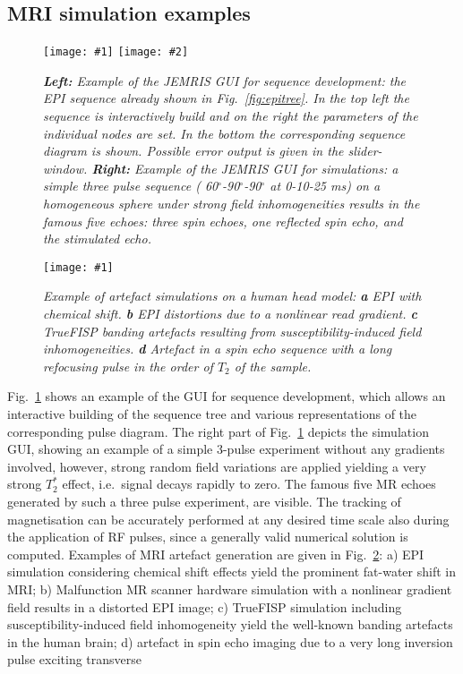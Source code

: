 \documentclass{nic-series}
\newcommand{\epsfigure}[5]{
 \begin{figure}[#4!]
   \begin{center}
    \texttt{[image: \#1]}
    \caption{{\sl #2}\label{#3}}
   \end{center}
 \end{figure}}
\newcommand{\epsfigures}[6]{
 \begin{figure}[#5!]
   \begin{center}
    \texttt{[image: \#1]}
    \hspace*{0.2cm}
    \texttt{[image: \#2]}
    \caption{{\sl #3}\label{#4}}
   \end{center}
 \end{figure}}
\begin{document}
\subsection{MRI simulation examples}
\epsfigures{fig/GUI_seq_ex1.eps}{fig/GUI_sim_ex1.eps}{{\bf Left:}  Example of the JEMRIS GUI for sequence development: the EPI sequence
			     already shown in Fig.~\ref{fig:epitree}. In the top left the sequence is interactively build and on the right
			     the parameters of the individual nodes are set. In the bottom the corresponding sequence
			     diagram is shown. Possible error output is given in the slider-window.
                             {\bf Right:} Example of the JEMRIS GUI for simulations: a simple three pulse sequence
			     ( 60$^\circ$-90$^\circ$-90$^\circ$ at 0-10-25 ms) on a homogeneous sphere under strong field inhomogeneities
			     results in the famous five echoes: three spin echoes, one reflected spin echo, and the stimulated
			     echo.}{fig:gui}{tp}{0.45}
\epsfigure{fig/simartex.eps}{Example of artefact simulations on a human head model: {\bf a} EPI with chemical shift.
                               {\bf b} EPI distortions due to a nonlinear read gradient. {\bf c} TrueFISP banding artefacts
				resulting from susceptibility-induced field inhomogeneities. {\bf d} Artefact in a spin echo
				sequence with a long refocusing pulse in the order of $T_2$ of the
				sample.}{fig:artifacts}{tp}{1.0}
Fig.~\ref{fig:gui} shows an example of the GUI for sequence development, which allows an interactive
building of the sequence tree and various representations of the corresponding pulse diagram. The right part of Fig.~\ref{fig:gui}
depicts the simulation GUI, showing an example of a simple 3-pulse experiment without any gradients involved, however, strong
random field variations are applied yielding a very strong $T_{2}^{*}$ effect, i.e.~signal decays rapidly to zero. The
famous five MR echoes generated by such a three pulse experiment, are visible. The tracking of magnetisation can be accurately
performed at any desired time scale also during the application of RF pulses, since a generally valid numerical solution is computed.
Examples of MRI artefact generation are given in Fig.~\ref{fig:artifacts}: a) EPI simulation considering chemical shift effects
yield the prominent fat-water shift in MRI; b) Malfunction MR scanner hardware simulation with a nonlinear gradient field results
in a distorted EPI image; c) TrueFISP simulation including susceptibility-induced field inhomogeneity yield the well-known
banding artefacts in the human brain; d) artefact in spin echo imaging due to a very long inversion pulse exciting transverse
\end{document}
